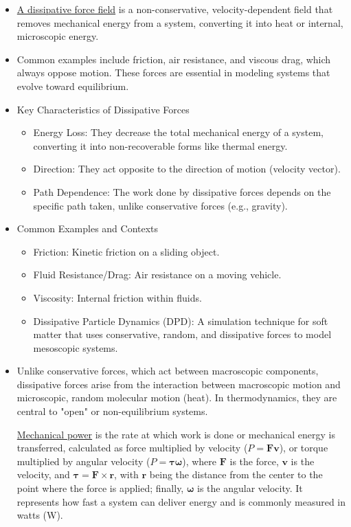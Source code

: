 \documentclass[t,aspectratio=169]{beamer}
\begin{document}
\begin{frame}
\begin{itemize}
\pagebreak

\item \underline{A dissipative force field} is a non-conservative, velocity-dependent field that removes mechanical energy from a system, converting it into heat or internal, microscopic energy.
\item Common examples include friction, air resistance, and viscous drag, which always oppose motion. These forces are essential in modeling systems that evolve toward equilibrium.
\item Key Characteristics of Dissipative Forces
\begin{itemize}
\item Energy Loss: They decrease the total mechanical energy of a system, converting it into non-recoverable forms like thermal energy.
\item Direction: They act opposite to the direction of motion (velocity vector).
\item Path Dependence: The work done by dissipative forces depends on the specific path taken, unlike conservative forces (e.g., gravity).
\end{itemize}

\pagebreak
\item Common Examples and Contexts
\begin{itemize}
\item  Friction: Kinetic friction on a sliding object.
\item Fluid Resistance/Drag: Air resistance on a moving vehicle.
\item Viscosity: Internal friction within fluids.
\item Dissipative Particle Dynamics (DPD): A simulation technique for soft matter that uses conservative, random, and dissipative forces to model mesoscopic systems.
\end{itemize}
\item Unlike conservative forces, which act between macroscopic components, dissipative forces arise from the interaction between macroscopic motion and microscopic, random molecular motion (heat). In thermodynamics, they are central to "open" or non-equilibrium systems. 

\pagebreak
\underline{Mechanical power} is the rate at which work is done or mechanical energy is transferred, calculated as force multiplied by velocity ($P=\mathbf{F}\mathbf{v}$), or torque multiplied by angular velocity ($P=\mathbf{\tau}\mathbf{\omega}$), where $\mathbf{F}$ is the force, $\mathbf{v}$ is the velocity, and $\mathbf{\tau}=\mathbf{F}\times\mathbf{r}$, with $\mathbf{r}$ being the distance from the center to the point where the force is applied; finally, $\mathbf{\omega}$ is the angular velocity. It represents how fast a system can deliver energy and is commonly measured in watts (W).

\end{itemize}
\end{frame}
\end{document}
